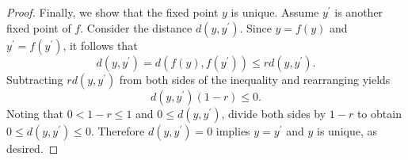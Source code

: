 \documentclass[12pt]{amsart}
\begin{document}
\begin{setup}
\begin{proof}
    Finally, we show that the fixed point $y$ is unique.
    Assume $y^\prime$ is another fixed point of $f$.
    Consider the distance $d(y, y^\prime)$.
    Since $y = f(y)$ and $y^\prime = f(y^\prime)$, it follows that 
    $$d(y, y^\prime) = d(f(y), f(y^\prime)) \leq rd(y,y^\prime).$$
    Subtracting $rd(y, y^\prime)$ from both sides of the inequality and rearranging yields
    $$d(y, y^\prime)(1-r) \leq 0.$$
    Noting that $0 < 1 - r \leq 1$ and $0 \leq d(y, y^\prime)$, divide both sides by $1-r$ to obtain $0 \leq d(y, y^\prime) \leq 0$.
    Therefore $d(y, y^\prime) = 0$ implies $y = y^\prime$ and $y$ is unique, as desired.
  \end{proof}
\end{setup}
\end{document}
